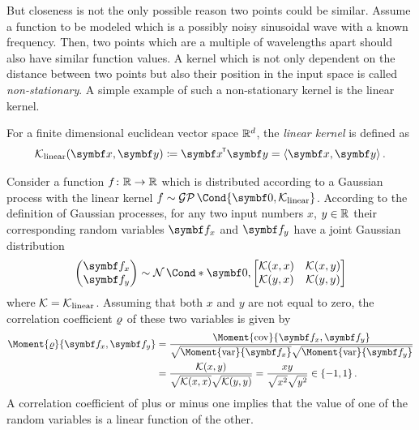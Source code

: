 But closeness is not the only possible reason two points could be similar.
Assume a function to be modeled which is a possibly noisy sinusoidal wave with a known frequency.
Then, two points which are a multiple of wavelengths apart should also have similar function values.
A kernel which is not only dependent on the distance between two points but also their position in the input space is called \emph{non-stationary}.
A simple example of such a non-stationary kernel is the linear kernel.
\begin{definition}
    For a finite dimensional euclidean vector space $\mathbb{R}^d$, the \emph{linear kernel} is defined as
    \begin{align}
        \K_{\text{linear}}(\mat{x}, \mat{y}) \coloneqq \mat{x}\tran \mat{y} = \left\langle \mat{x}, \mat{y}\right\rangle.
    \end{align}
\end{definition}
Consider a function $f \colon \mathbb{R} \to \mathbb{R}$ which is distributed according to a Gaussian process with the linear kernel $f \sim \GP\Cond{\mat{0}, \K_{\text{linear}}}$.
According to the definition of Gaussian processes, for any two input numbers $x$, $y \in \mathbb{R}$ their corresponding random variables $\rv{f_x}$ and $\rv{f_y}$ have a joint Gaussian distribution
\begin{align}
    \begin{pmatrix}
        \rv{f_x} \\ \rv{f_y}
    \end{pmatrix} \sim \Gaussian*{\mat{0}, \begin{bmatrix}
        \K(x, x) & \K(x, y) \\
        \K(y, x) & \K(y, y)
    \end{bmatrix}}
\end{align}
where $\operatorname{\mathcal{K}} = \operatorname{\mathcal{K}}_{\text{linear}}$.
Assuming that both $x$ and $y$ are not equal to zero, the correlation coefficient $\operatorname{\varrho}$ of these two variables is given by
\begin{align}
    \begin{split}
        \Moment{\corr}{\rv{f_x}, \rv{f_y}} &= \frac{\Moment{\cov}{\rv{f_x}, \rv{f_y}}}{\sqrt{\Moment{\var}{\rv{f_x}\vphantom{\rv{f_y}}}}\sqrt{\Moment{\var}{\rv{f_y}}}} \\
              &= \frac{\K(x, y)}{\sqrt{\K(x, x)} \sqrt{\K(y, y)}} = \frac{xy}{\sqrt{\vphantom{y^2}x^2}\sqrt{\vphantom{y^2}y^2}} \in \left\{ -1, 1 \right\}.
    \end{split}
\end{align}
A correlation coefficient of plus or minus one implies that the value of one of the random variables is a linear function of the other.
